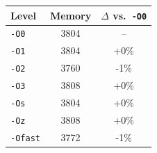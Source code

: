 \begin{tabular*}{\columnwidth}{@{\extracolsep\fill}lcc@{\extracolsep\fill}}
\toprule
\textbf{Level} & \textbf{Memory} & \textbf{$\Delta$ vs.\ \texttt{-O0}} \\
\midrule
\texttt{-O0} & 3804 & -- \\
\texttt{-O1} & 3804 & +0\% \\
\texttt{-O2} & 3760 & -1\% \\
\texttt{-O3} & 3808 & +0\% \\
\texttt{-Os} & 3804 & +0\% \\
\texttt{-Oz} & 3808 & +0\% \\
\texttt{-Ofast} & 3772 & -1\% \\
\bottomrule
\end{tabular*}

